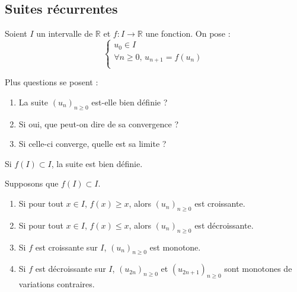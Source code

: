 \documentclass[french,11pt,twoside]{VcCours}
\begin{document}
\subsection{Suites récurrentes}

Soient $I$ un intervalle de $\mathbb{R}$ et $f : I \rightarrow \mathbb{R}$ une fonction. On pose :
$$ \left\lbrace \begin{array}{l}
u_0 \in I \\
\forall n \geq 0, \, u_{n+1} = f(u_n) \\
\end{array}\right.$$

Plus questions se posent :

\begin{enumerate}
\item La suite $(u_n)_{n \geq 0}$ est-elle bien définie ?
\item Si oui, que peut-on dire de sa convergence ?
\item Si celle-ci converge, quelle est sa limite ?
\end{enumerate}

\medskip

\begin{Proposition}{} Si $f(I) \subset I$, la suite est bien définie.
\end{Proposition}


\begin{Proposition}{} Supposons que $f(I) \subset I$.

\begin{enumerate}
\item Si pour tout $x \in I$, $f(x) \geq x$, alors $(u_n)_{n \geq 0}$ est croissante.
\item Si pour tout $x \in I$, $f(x) \leq x$, alors $(u_n)_{n \geq 0}$ est décroissante.
\item Si $f$ est croissante sur $I$, $(u_n)_{n \geq 0}$ est monotone.
\item Si $f$ est décroissante sur $I$, $(u_{2n})_{n \geq 0}$ et $(u_{2n+1})_{n \geq 0}$ sont monotones de variations contraires.
\end{enumerate}
\end{Proposition}
\end{document}
